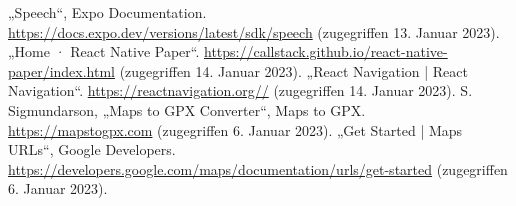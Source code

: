 \documentclass[12pt,oneside]{report}
\begin{document}
\begin{thebibliography}{10}
     „Speech“, Expo Documentation. \url{https://docs.expo.dev/versions/latest/sdk/speech} (zugegriffen 13. Januar 2023).
     „Home · React Native Paper“. \url{https://callstack.github.io/react-native-paper/index.html} (zugegriffen 14. Januar 2023).
     „React Navigation | React Navigation“. \url{https://reactnavigation.org//} (zugegriffen 14. Januar 2023).
     S. Sigmundarson, „Maps to GPX Converter“, Maps to GPX. \url{https://mapstogpx.com} (zugegriffen 6. Januar 2023).
     „Get Started | Maps URLs“, Google Developers. \url{https://developers.google.com/maps/documentation/urls/get-started} (zugegriffen 6. Januar 2023).
    
    
    
    
    
    
    
    
    
    
    
    
    
  \end{thebibliography}
  \newpage
  
  \listoffigures
  \newpage
  
  \lstlistoflistings
  \newpage

  
\end{document}
